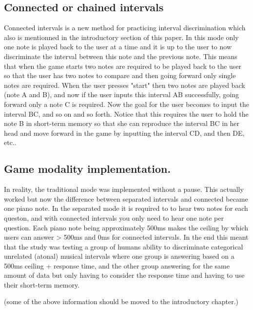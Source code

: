 \subsection{Connected or chained intervals}
Connected intervals is a new method for practicing interval discrimination which also is mentionned in the introductory section of this paper. In this mode only one note is played back to the user at a time and it is up to the user to now discriminate the interval between this note and the previous note. This means that when the game starts two notes are required to be played back to the user so that the user has two notes to compare and then going forward only single notes are required. When the user presses "start" then two notes are played back (note A and B), and now if the user inputs this interval AB successfully, going forward only a note C is required. Now the goal for the user becomes to input the interval BC, and so on and so forth. Notice that this requires the user to hold the note B in short-term memory so that she can reproduce the interval BC in her head and move forward in the game by inputting the interval CD, and then DE, etc..

\subsection{Game modality implementation.}
In reality, the traditional mode was implemented without a pause. This actually worked but now the difference between separated intervals and connected became one piano note. In the separated mode
it is required to to hear two notes for each queston, and with connected intervals you only need to hear one note per question. Each piano note being approximately 500ms makes the ceiling by which users can answer > 500ms and 0ms for connected intervals. In the end this meant that the study was testing a group of humans ability to discriminate categorical unrelated (atonal) musical intervals where one group is answering based on a 500ms ceiling + response time, and the other group answering for the same amount of data but only having to consider the response time and having to use their short-term memory.

(some of the above information should be moved to the introductory chapter.)





